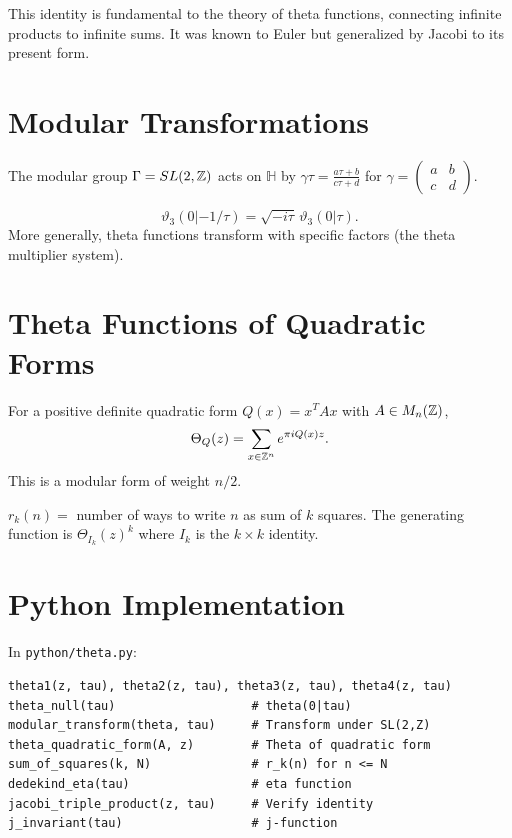 This identity is fundamental to the theory of theta functions, connecting infinite products to infinite sums. It was known to Euler but generalized by Jacobi to its present form.

\section{Modular Transformations}

The modular group $\Gamma = SL(2,\mathbb{Z})$ acts on $\mathbb{H}$ by $\gamma \tau = \frac{a\tau + b}{c\tau + d}$ for $\gamma = \begin{pmatrix} a & b \\ c & d \end{pmatrix}$.

\begin{theorem}
\[
\vartheta_3(0|-1/\tau) = \sqrt{-i\tau}\, \vartheta_3(0|\tau).
\]
More generally, theta functions transform with specific factors (the theta multiplier system).
\end{theorem}

\section{Theta Functions of Quadratic Forms}

For a positive definite quadratic form $Q(x) = x^T A x$ with $A \in M_n(\mathbb{Z})$,
\[
\Theta_Q(z) = \sum_{x \in \mathbb{Z}^n} e^{\pi i Q(x) z}.
\]
This is a modular form of weight $n/2$.

\begin{example}
$r_k(n) =$ number of ways to write $n$ as sum of $k$ squares.
The generating function is $\Theta_{I_k}(z)^k$ where $I_k$ is the $k\times k$ identity.
\end{example}

\section{Python Implementation}

In \texttt{python/theta.py}:

\begin{lstlisting}[style=python, caption={Key functions in python/theta.py}]
theta1(z, tau), theta2(z, tau), theta3(z, tau), theta4(z, tau)
theta_null(tau)                   # theta(0|tau)
modular_transform(theta, tau)     # Transform under SL(2,Z)
theta_quadratic_form(A, z)        # Theta of quadratic form
sum_of_squares(k, N)              # r_k(n) for n <= N
dedekind_eta(tau)                 # eta function
jacobi_triple_product(z, tau)     # Verify identity
j_invariant(tau)                  # j-function
\end{lstlisting}

